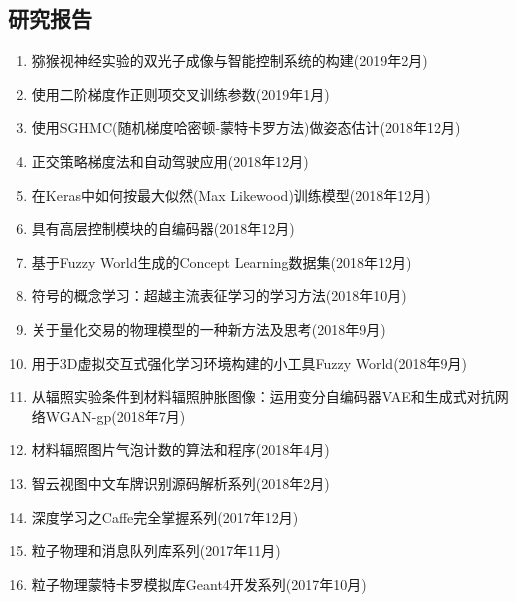 \begin{publications}
\section*{研究报告}
\begin{enumerate}
\item 猕猴视神经实验的双光子成像与智能控制系统的构建(2019年2月)
\item 使用二阶梯度作正则项交叉训练参数(2019年1月)
\item 使用SGHMC(随机梯度哈密顿-蒙特卡罗方法)做姿态估计(2018年12月)
\item 正交策略梯度法和自动驾驶应用(2018年12月)
\item 在Keras中如何按最大似然(Max Likewood)训练模型(2018年12月)
\item 具有高层控制模块的自编码器(2018年12月)
\item 基于Fuzzy World生成的Concept Learning数据集(2018年12月)
\item 符号的概念学习：超越主流表征学习的学习方法(2018年10月)
\item 关于量化交易的物理模型的一种新方法及思考(2018年9月)
\item 用于3D虚拟交互式强化学习环境构建的小工具Fuzzy World(2018年9月)
\item 从辐照实验条件到材料辐照肿胀图像：运用变分自编码器VAE和生成式对抗网络WGAN-gp(2018年7月)
\item 材料辐照图片气泡计数的算法和程序(2018年4月)
\item 智云视图中文车牌识别源码解析系列(2018年2月)
\item 深度学习之Caffe完全掌握系列(2017年12月)
\item 粒子物理和消息队列库系列(2017年11月)
\item 粒子物理蒙特卡罗模拟库Geant4开发系列(2017年10月)


\end{enumerate}

\end{publications}
